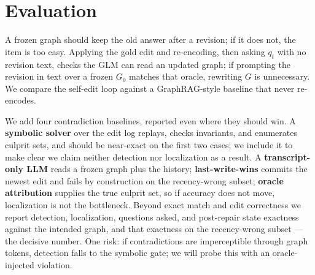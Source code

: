 \documentclass[11pt]{article}
\begin{document}
\section{Evaluation}

A frozen graph should keep the old answer after a revision; if it does not, the
item is too easy. Applying the gold edit and re-encoding, then asking $q_t$ with
no revision text, checks the GLM can read an updated graph; if prompting the
revision in text over a frozen $G_0$ matches that oracle, rewriting $G$ is
unnecessary. We compare the self-edit loop against a GraphRAG-style baseline that
never re-encodes.

We add four contradiction baselines, reported even where they should win. A
\textbf{symbolic solver} over the edit log replays, checks invariants, and
enumerates culprit sets, and should be near-exact on the first two cases; we
include it to make clear we claim neither detection nor localization as a result. A
\textbf{transcript-only LLM} reads a frozen graph plus the history;
\textbf{last-write-wins} commits the newest edit and fails by construction on the
recency-wrong subset; \textbf{oracle attribution} supplies the true culprit set,
so if accuracy does not move, localization is not the bottleneck. Beyond exact
match and edit correctness we report detection, localization, questions asked, and
post-repair state exactness against the intended graph, and that exactness on the
recency-wrong subset --- the decisive number. One risk: if contradictions are
imperceptible through graph tokens, detection falls to the symbolic gate; we will
probe this with an oracle-injected violation.


\end{document}

